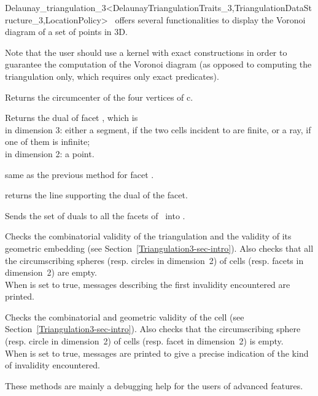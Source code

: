 \begin{ccRefClass}{Delaunay_triangulation_3<DelaunayTriangulationTraits_3,TriangulationDataStructure_3,LocationPolicy>}
\cgal\ offers several functionalities to display the Voronoi diagram of 
a set of points in 3D.

Note that the user should use a kernel with exact constructions in order
to guarantee the computation of the Voronoi diagram (as opposed to computing
the triangulation only, which requires only exact predicates).

{Returns the circumcenter of the four vertices of c.
}

{Returns the dual of facet , which is \\
in dimension 3: either a segment, if the two cells incident to   
are finite, or a ray, if one of them is infinite;\\
in dimension 2: a point.
}

{same as the previous method for facet .}

{returns the line supporting the dual of the facet.
}

{Sends the set of duals to all the facets of \ccVar\ into .}


\begin{ccDebug}
{Checks the combinatorial validity of the triangulation and the
validity of its geometric embedding (see
Section~\ref{Triangulation3-sec-intro}). Also checks that all the
circumscribing spheres (resp. circles in dimension~2) of  cells
(resp. facets in dimension~2) are empty.\\ When  is set to
true,  messages describing the first invalidity encountered are
printed.}

{Checks the combinatorial and geometric validity of the cell (see
Section~\ref{Triangulation3-sec-intro}). Also checks that the
circumscribing sphere (resp. circle in dimension~2) of  cells
(resp. facet in dimension~2) is empty.\\
 When  is set to
true, messages are printed to give
a precise indication of the kind of invalidity encountered.}

These methods are  mainly a debugging help for the users of advanced features.
\end{ccDebug}

\ccSeeAlso


\end{ccRefClass}
